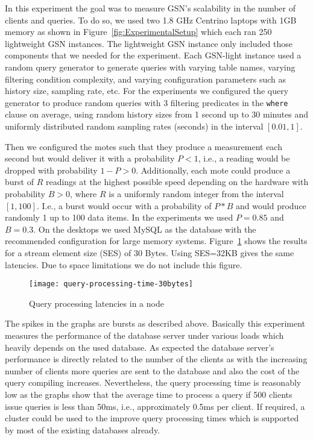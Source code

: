 In this experiment the goal was to measure GSN's scalability in the number of
clients and queries. To do so, we used two 1.8 GHz Centrino laptops with 1GB
memory as shown in Figure~\ref{fig:ExperimentalSetup} which each ran 250
lightweight GSN instances. The lightweight GSN instance only included those
components that we needed for the experiment. Each GSN-light instance used a
random query generator to generate queries with varying table names, varying
filtering condition complexity, and varying configuration parameters such as
history size, sampling rate, etc. For the experiments we configured the query
generator to produce random queries with 3 filtering predicates in the
\texttt{where} clause on average, using random history sizes from 1 second up
to 30 minutes and uniformly distributed random sampling rates (seconds) in the
interval $[0.01,1]$.

Then we configured the motes such that they produce a measurement each second
but would deliver it with a probability $P<1$, i.e., a reading would be dropped
with probability $1-P>0$.  Additionally, each mote could produce a burst of $R$
readings at the highest possible speed depending on the hardware with
probability $B>0$, where $R$ is a uniformly random integer from the interval
$[1,100]$. I.e., a burst would occur with a probability of $P * B$ and would
produce randomly 1 up to 100 data items.  In the experiments we used $P=0.85$
and $B=0.3$. On the desktops we used MySQL as the database with the recommended
configuration for large memory systems.
Figure~\ref{fig:QueryProcessingLatency} shows the results for a stream element
size (SES) of 30 Bytes. Using SES=32KB gives the same latencies. Due
to space limitations we do not include this figure.

\begin{figure}%
  \centering
  \texttt{[image: query-processing-time-30bytes]}
  \caption{Query processing latencies in a node}
  \label{fig:QueryProcessingLatency}
\end{figure}

The spikes in the graphs are bursts as described above. Basically this
experiment measures the performance of the database server under various loads
which heavily depends on the used database. As expected the database server's
performance is directly related to the number of the clients as with the
increasing number of clients more queries are sent to the database and also the
cost of the query compiling increases. Nevertheless, the query processing time
is reasonably low as the graphs show that the average time to process a query
if 500 clients issue queries is less than 50ms, i.e., approximately 0.5ms per
client. If required, a cluster could be used to the improve query processing
times which is supported by most of the existing databases already.

